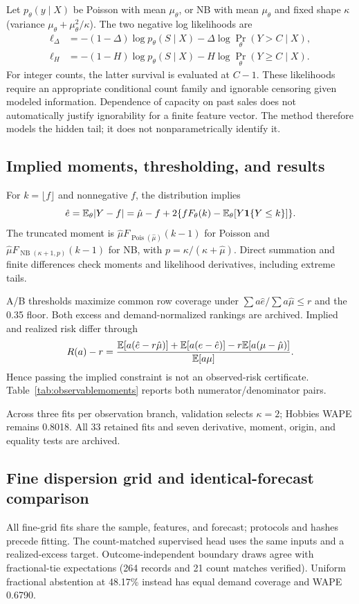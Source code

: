 Let $p_\theta(y\mid X)$ be Poisson with mean $\mu_\theta$, or NB with mean $\mu_\theta$ and fixed shape $\kappa$ (variance $\mu_\theta+\mu_\theta^2/\kappa$). The two negative log likelihoods are
\begin{align*}
 \ell_\Delta&=-(1-\Delta)\log p_\theta(S\mid X)-\Delta\log\Pr_\theta(Y>C\mid X),\\
 \ell_H&=-(1-H)\log p_\theta(S\mid X)-H\log\Pr_\theta(Y\geq C\mid X).
\end{align*}
For integer counts, the latter survival is evaluated at $C-1$. These likelihoods require an appropriate conditional count family and ignorable censoring given modeled information. Dependence of capacity on past sales does not automatically justify ignorability for a finite feature vector. The method therefore models the hidden tail; it does not nonparametrically identify it.

\subsection{Implied moments, thresholding, and results}
For $k=\lfloor f\rfloor$ and nonnegative $f$, the distribution implies
\[
 \hat e=\mathbb{E}_\theta|Y-f|=\hat\mu-f+2\{fF_\theta(k)-\mathbb{E}_\theta[Y\mathbf{1}\{Y\leq k\}]\}.
\]
The truncated moment is $\hat\mu F_{\operatorname{Pois}(\hat\mu)}(k-1)$ for Poisson and $\hat\mu F_{\operatorname{NB}(\kappa+1,p)}(k-1)$ for NB, with $p=\kappa/(\kappa+\hat\mu)$. Direct summation and finite differences check moments and likelihood derivatives, including extreme tails.

A/B thresholds maximize common row coverage under $\sum a\hat e/\sum a\hat\mu\leq r$ and the 0.35 floor. Both excess and demand-normalized rankings are archived. Implied and realized risk differ through
\[
 R(a)-r=\frac{\mathbb{E}[a(\hat e-r\hat\mu)]+\mathbb{E}[a(e-\hat e)]-r\mathbb{E}[a(\mu-\hat\mu)]}{\mathbb{E}[a\mu]}.
\]
Hence passing the implied constraint is not an observed-risk certificate. Table~\ref{tab:observablemoments} reports both numerator/denominator pairs.


Across three fits per observation branch, validation selects $\kappa=2$; Hobbies WAPE remains 0.8018. All 33 retained fits and seven derivative, moment, origin, and equality tests are archived.

\FloatBarrier
\subsection{Fine dispersion grid and identical-forecast comparison}
All fine-grid fits share the sample, features, and forecast; protocols and hashes precede fitting. The count-matched supervised head uses the same inputs and a realized-excess target. Outcome-independent boundary draws agree with fractional-tie expectations (264 records and 21 count matches verified). Uniform fractional abstention at 48.17\% instead has equal demand coverage and WAPE 0.6790.

